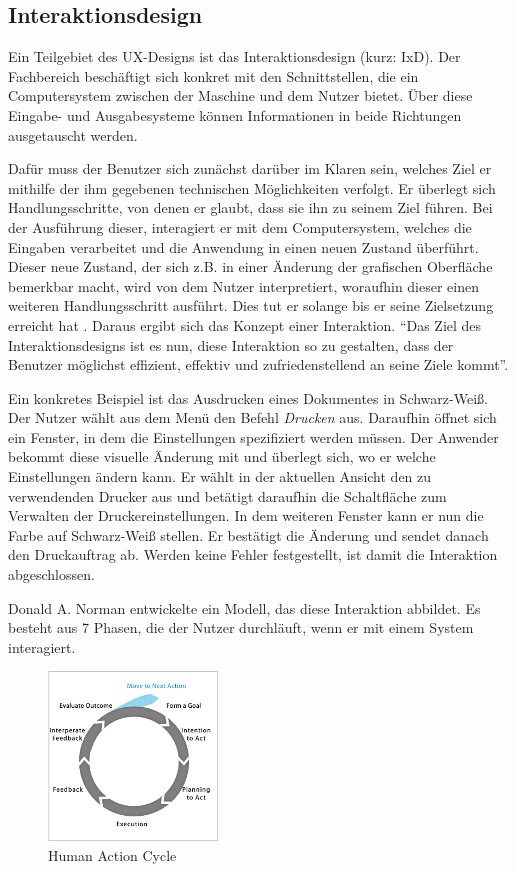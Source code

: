 \subsection{Interaktionsdesign} \label{sec:interactionDesign}
Ein Teilgebiet des UX-Designs ist das Interaktionsdesign (kurz: IxD). Der Fachbereich beschäftigt sich konkret mit den Schnittstellen, die ein Computersystem zwischen der Maschine und dem Nutzer bietet. Über diese Eingabe- und Ausgabesysteme können Informationen in beide Richtungen ausgetauscht werden.\par
Dafür muss der Benutzer sich zunächst darüber im Klaren sein, welches Ziel er mithilfe der ihm gegebenen technischen Möglichkeiten verfolgt. Er überlegt sich Handlungsschritte, von denen er glaubt, dass sie ihn zu seinem Ziel führen. Bei der Ausführung dieser, interagiert er mit dem Computersystem, welches die Eingaben verarbeitet und die Anwendung in einen neuen Zustand überführt. Dieser neue Zustand, der sich z.B. in einer Änderung der grafischen Oberfläche bemerkbar macht, wird von dem Nutzer interpretiert, woraufhin dieser einen weiteren Handlungsschritt ausführt. Dies tut er solange bis er seine Zielsetzung erreicht hat \cite{Ullenboom2014}. Daraus ergibt sich das Konzept einer Interaktion. \enquote{Das Ziel des Interaktionsdesigns ist es nun, diese Interaktion so zu gestalten, dass der Benutzer möglichst effizient, effektiv und zufriedenstellend an seine Ziele kommt\cite[S. 122]{Ullenboom2014}}.\par
Ein konkretes Beispiel ist das Ausdrucken eines Dokumentes in Schwarz-Weiß. Der Nutzer wählt aus dem Menü den Befehl \textit{Drucken} aus. Daraufhin öffnet sich ein Fenster, in dem die Einstellungen spezifiziert werden müssen. Der Anwender bekommt diese visuelle Änderung mit und überlegt sich, wo er welche Einstellungen ändern kann. Er wählt in der aktuellen Ansicht den zu verwendenden Drucker aus und betätigt daraufhin die Schaltfläche zum Verwalten der Druckereinstellungen. In dem weiteren Fenster kann er nun die Farbe auf Schwarz-Weiß stellen. Er bestätigt die Änderung und sendet danach den Druckauftrag ab. Werden keine Fehler festgestellt, ist damit die Interaktion abgeschlossen.\par
Donald A. Norman entwickelte ein Modell, das diese Interaktion abbildet. Es besteht aus 7 Phasen, die der Nutzer durchläuft, wenn er mit einem System interagiert. \par
\begin{figure}[H]
 \centering
 \includegraphics[width=0.4\textwidth]{grafiken/action_cycle.png}
 \caption{Human Action Cycle \cite{Kinser2011}}
 \label{fig:actionCycle}
\end{figure}
